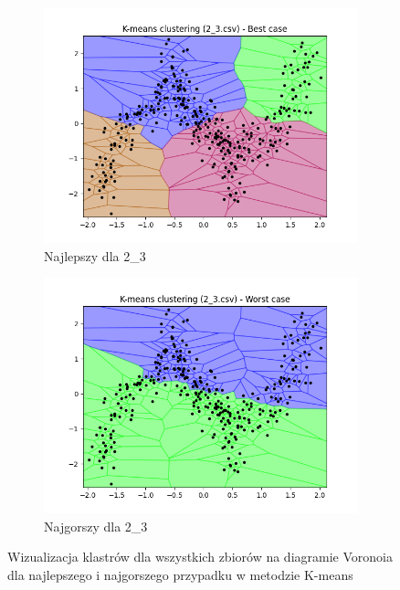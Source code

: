 \documentclass[12pt]{article}
\begin{document}
\begin{figure}[H]
\begin{subfigure}[b]{0.24\textwidth}
        \includegraphics[width=\linewidth]{img/exp_1/kmeans/2_3_best.png}
        \caption{Najlepszy dla 2\_3}
    \end{subfigure}
    \hfill
    \begin{subfigure}[b]{0.24\textwidth}
        \includegraphics[width=\linewidth]{img/exp_1/kmeans/2_3_worst.png}
        \caption{Najgorszy dla 2\_3}
    \end{subfigure}
    \caption{\centering Wizualizacja klastrów dla wszystkich zbiorów na diagramie Voronoia dla najlepszego i najgorszego przypadku w metodzie K-means}
\end{figure}

\pagebreak
\end{document}
